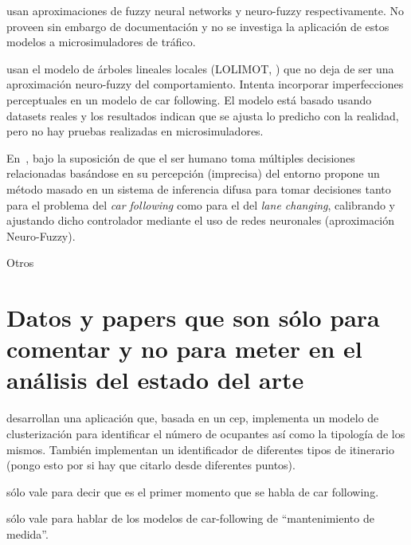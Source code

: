 \cite{Li2003, Ma2004} usan aproximaciones de fuzzy neural networks y neuro-fuzzy respectivamente. No proveen sin embargo de documentación y no se investiga la aplicación de estos modelos a microsimuladores de tráfico.

\cite{Aghabayk2013} usan el modelo de árboles lineales locales (LOLIMOT, \cite{Nelles2013}) que no deja de ser una aproximación neuro-fuzzy del comportamiento. Intenta incorporar imperfecciones perceptuales en un modelo de car following. El modelo está basado usando datasets reales y los resultados indican que se ajusta lo predicho con la realidad, pero no hay pruebas realizadas en microsimuladores.

En~\cite{Ma2004}, bajo la suposición de que el ser humano toma múltiples decisiones relacionadas basándose en su percepción (imprecisa) del entorno propone un método masado en un sistema de inferencia difusa para tomar decisiones tanto para el problema del \textit{car following} como para el del \textit{lane changing}, calibrando y ajustando dicho controlador mediante el uso de redes neuronales (aproximación Neuro-Fuzzy).

Otros~\cite{Colombaroni2013,Kesting2008,Chong2011,Abbas2011,Chong2011a,Abbas2012,Chong2013}

\section{Datos y papers que son sólo para comentar y no para meter en el análisis del estado del arte}

\cite{terroso2015complex} desarrollan una aplicación que, basada en un \gls{cep}, implementa un modelo de clusterización para identificar el número de ocupantes así como la tipología de los mismos. También implementan un identificador de diferentes tipos de itinerario (pongo esto por si hay que citarlo desde diferentes puntos).

\cite{reuschel1950} sólo vale para decir que es el primer momento que se habla de car following.

\cite{Pipes1953} sólo vale para hablar de los modelos de car-following de \enquote{mantenimiento de medida}.

